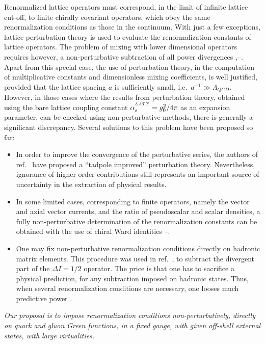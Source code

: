 Renormalized lattice operators must
correspond, in the limit of
infinite lattice cut-off, to finite chirally covariant operators, which
obey the same renormalization conditions as those in the continuum.
 With just a few exceptions, lattice perturbation theory is
 used to evaluate
the  renormalization constants of lattice operators.
The problem of mixing with lower dimensional
operators requires however, a non-perturbative
subtraction of all power divergences \cite{bo},\cite{te}--\cite{martsukuba}.
Apart from this special case,
the use of perturbation theory, in the computation of
multiplicative  constants and dimensionless mixing coefficients,
is well justified,
provided that the lattice spacing $a$ is sufficiently small,
i.e.\ $ a^{-1} \gg \Lambda_{QCD}$.
However, in those cases where the results from perturbation theory,
obtained using the bare lattice
coupling constant $\alpha_s^{{}^{LATT}}=g_{0}^{2}/4 \pi$ as an
expansion parameter, can be checked
using non-perturbative methods, there is generally a significant
discrepancy.
Several solutions to this problem have been proposed so far:
\begin{itemize}
\item
In order to improve the convergence
of the perturbative series,
the authors of ref.\ \cite{lepage} have  proposed a
``tadpole improved'' perturbation theory.
Nevertheless, ignorance of higher order contributions still  represents an
important source
of uncertainty in the extraction of physical results.
\item
In some limited cases, corresponding to finite
operators, namely the vector and axial vector currents,
and  the ratio of pseudoscalar and scalar densities, a fully
non-perturbative determination of the renormalization constants can be
obtained with the use of chiral Ward identities \cite{bo}--\cite{wi}.
\item
One may fix  non-perturbative renormalization conditions directly on
hadronic matrix elements. This procedure was used in ref.\ \cite{gav1},
to subtract the divergent part of the $\Delta I=1/2$ operator.
The price is that one has to sacrifice
 a physical prediction, for any subtraction imposed
on hadronic states. Thus, when several
renormalization
conditions are necessary,
 one  looses much predictive power \cite{bo,te}.
\end{itemize}

{\itshape
Our proposal is to impose
re\-nor\-ma\-li\-za\-tion con\-di\-tions
non-per\-tur\-ba\-ti\-vely,  di\-rectly on quark and
gluon Green functions, in a fixed gauge, with given off-shell
ex\-ter\-nal sta\-tes, with large vir\-tua\-li\-ties.}

